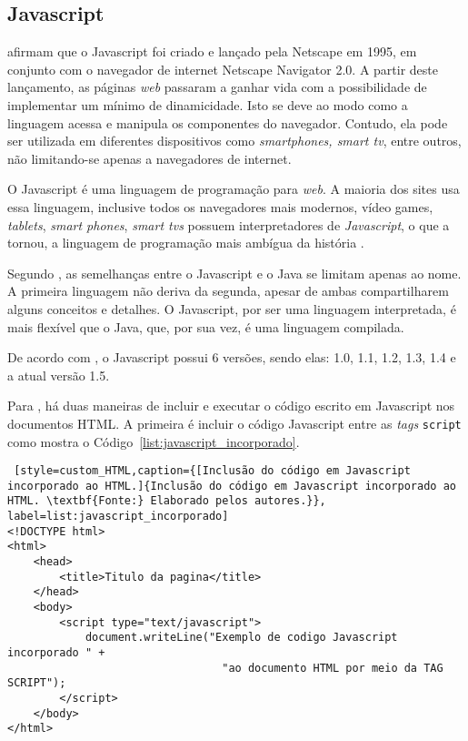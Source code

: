 \subsection{Javascript}

 afirmam que o Javascript foi criado e lançado pela Netscape em 1995, em conjunto com o navegador de internet Netscape Navigator 2.0. A partir deste lançamento, as páginas \textit{web} passaram a ganhar vida com a possibilidade de implementar um mínimo de dinamicidade. Isto se deve ao modo como a linguagem acessa e manipula os componentes do navegador. Contudo, ela pode ser utilizada em diferentes dispositivos como \textit{smartphones, smart tv}, entre outros, não limitando-se apenas a navegadores de internet.

O Javascript é uma linguagem de programação para \textit{web}. A maioria dos sites usa essa linguagem, inclusive todos os navegadores mais modernos, vídeo games, \textit{tablets}, \textit{smart phones}, \textit{smart tvs} possuem interpretadores de \textit{Javascript}, o que a tornou, a linguagem de programação mais ambígua da história \cite{flanagan_javascript_definitive_guide}.

Segundo , as semelhanças entre o Javascript e o Java se limitam apenas ao nome. A primeira linguagem não deriva da segunda, apesar de ambas compartilharem alguns conceitos e detalhes. O Javascript, por ser uma linguagem interpretada, é mais flexível que o Java, que, por sua vez, é uma linguagem compilada.

De acordo com , o Javascript possui 6 versões, sendo elas: 1.0, 1.1, 1.2, 1.3, 1.4 e a atual versão 1.5.

Para , há duas maneiras de incluir e executar o código escrito em Javascript nos documentos HTML. A primeira é incluir o código Javascript entre as \textit{tags} \texttt{script} como mostra o Código~\ref{list:javascript_incorporado}. 

\begin{lstlisting} [style=custom_HTML,caption={[Inclusão do código em Javascript incorporado ao HTML.]{Inclusão do código em Javascript incorporado ao HTML. \textbf{Fonte:} Elaborado pelos autores.}}, label=list:javascript_incorporado] 	
<!DOCTYPE html>
<html>
	<head>
		<title>Titulo da pagina</title>
	</head>
	<body>
		<script type="text/javascript">
			document.writeLine("Exemplo de codigo Javascript incorporado " +
								 "ao documento HTML por meio da TAG SCRIPT");
		</script>
	</body>
</html>
\end{lstlisting}

